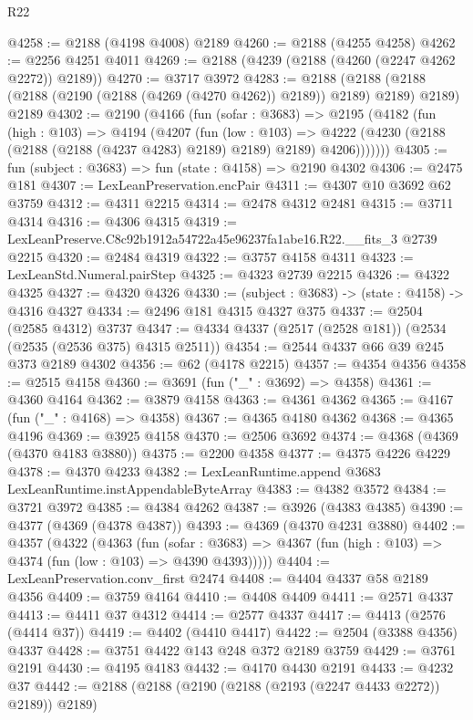 \begin{lexlean}{R22}
\begin{coremodule}
@4258 := @2188 (@4198 @4008) @2189
@4260 := @2188 (@4255 @4258)
@4262 := @2256 @4251 @4011
@4269 := @2188 (@4239 (@2188 (@4260 (@2247 @4262 @2272)) @2189))
@4270 := @3717 @3972
@4283 := @2188
    (@2188 (@2188 (@2188 (@2190 (@2188 (@4269 (@4270 @4262)) @2189)) @2189) @2189) @2189)
    @2189
@4302 := @2190
    (@4166
      (fun (sofar : @3683) =>
      @2195
        (@4182
          (fun (high : @103) =>
          @4194
            (@4207
              (fun (low : @103) =>
              @4222 (@4230 (@2188 (@2188 (@2188 (@4237 @4283) @2189) @2189) @2189) @4206)))))))
@4305 := fun (subject : @3683) => fun (state : @4158) => @2190 @4302
@4306 := @2475 @181
@4307 := LexLeanPreservation.encPair
@4311 := @4307 @10 @3692 @62 @3759
@4312 := @4311 @2215
@4314 := @2478 @4312 @2481
@4315 := @3711 @4314
@4316 := @4306 @4315
@4319 := LexLeanPreserve.C8c92b1912a54722a45e96237fa1abe16.R22.__fits_3 @2739 @2215
@4320 := @2484 @4319
@4322 := @3757 @4158 @4311
@4323 := LexLeanStd.Numeral.pairStep
@4325 := @4323 @2739 @2215
@4326 := @4322 @4325
@4327 := @4320 @4326
@4330 := (subject : @3683) -> (state : @4158) -> @4316 @4327
@4334 := @2496 @181 @4315 @4327 @375
@4337 := @2504 (@2585 @4312) @3737
@4347 := @4334 @4337 (@2517 (@2528 @181)) (@2534 (@2535 (@2536 @375) @4315 @2511))
@4354 := @2544 @4337 @66 @39 @245 @373 @2189 @4302
@4356 := @62 (@4178 @2215)
@4357 := @4354 @4356
@4358 := @2515 @4158
@4360 := @3691 (fun ("_" : @3692) => @4358)
@4361 := @4360 @4164
@4362 := @3879 @4158
@4363 := @4361 @4362
@4365 := @4167 (fun ("_" : @4168) => @4358)
@4367 := @4365 @4180 @4362
@4368 := @4365 @4196
@4369 := @3925 @4158
@4370 := @2506 @3692
@4374 := @4368 (@4369 (@4370 @4183 @3880))
@4375 := @2200 @4358
@4377 := @4375 @4226 @4229
@4378 := @4370 @4233
@4382 := LexLeanRuntime.append @3683 LexLeanRuntime.instAppendableByteArray
@4383 := @4382 @3572
@4384 := @3721 @3972
@4385 := @4384 @4262
@4387 := @3926 (@4383 @4385)
@4390 := @4377 (@4369 (@4378 @4387))
@4393 := @4369 (@4370 @4231 @3880)
@4402 := @4357
    (@4322
      (@4363
        (fun (sofar : @3683) =>
        @4367 (fun (high : @103) => @4374 (fun (low : @103) => @4390 @4393)))))
@4404 := LexLeanPreservation.conv_first @2474
@4408 := @4404 @4337 @58 @2189 @4356
@4409 := @3759 @4164
@4410 := @4408 @4409
@4411 := @2571 @4337
@4413 := @4411 @37 @4312
@4414 := @2577 @4337
@4417 := @4413 (@2576 (@4414 @37))
@4419 := @4402 (@4410 @4417)
@4422 := @2504 (@3388 @4356) @4337
@4428 := @3751 @4422 @143 @248 @372 @2189 @3759
@4429 := @3761 @2191
@4430 := @4195 @4183
@4432 := @4170 @4430 @2191
@4433 := @4232 @37
@4442 := @2188 (@2188 (@2190 (@2188 (@2193 (@2247 @4433 @2272)) @2189)) @2189)

\end{coremodule}
\end{lexlean}
